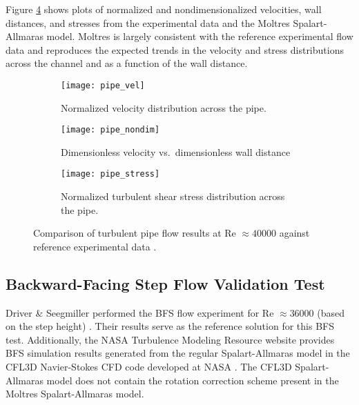 Figure \ref{fig:pipe-verification} shows plots of normalized and nondimensionalized velocities,
wall distances, and stresses from the experimental data \cite{laufer_structure_1954}
and the Moltres Spalart-Allmaras model. Moltres is largely consistent with the reference
experimental flow data and reproduces the expected trends in the velocity and stress distributions
across the channel and as a function of the wall distance.

\begin{figure}[p]
  \centering
  \begin{subfigure}[b]{0.48\columnwidth}
    \centering
    \texttt{[image: pipe\_vel]}
    \caption{Normalized velocity distribution across the pipe.}
    \label{fig:pipe-vel}
  \end{subfigure}
  \hfill
  \begin{subfigure}[b]{0.48\columnwidth}
    \centering
    \texttt{[image: pipe\_nondim]}
    \caption{Dimensionless velocity vs.\ dimensionless wall distance}
    \label{fig:pipe-nondim}
  \end{subfigure}
  \begin{subfigure}[b]{0.48\columnwidth}
    \centering
    \texttt{[image: pipe\_stress]}
    \caption{Normalized turbulent shear stress distribution across the pipe.}
    \label{fig:pipe-stress}
  \end{subfigure}
  \caption{Comparison of turbulent pipe flow results at Re $\approx 40000$ against reference
  experimental data \cite{laufer_structure_1954}.}
  \label{fig:pipe-verification}
\end{figure}

\FloatBarrier

\subsection{Backward-Facing Step Flow Validation Test}

Driver \& Seegmiller performed the \gls{BFS} flow experiment for Re $\approx36000$ (based on the
step height)
\cite{driver_features_1985}. Their results serve as the reference solution for this \gls{BFS} test.
Additionally, the \gls{NASA} Turbulence Modeling Resource website \cite{rumsey_turbulence_nodate}
provides \gls{BFS} simulation results generated from the regular Spalart-Allmaras model in the CFL3D
Navier-Stokes CFD code developed at \gls{NASA} \cite{krist_cfl3d_1998}. The CFL3D Spalart-Allmaras model
does not contain the rotation correction scheme
\cite{aupoix_extensions_2003, dacles-mariani_numericalexperimental_1995} present in the Moltres
Spalart-Allmaras model.

